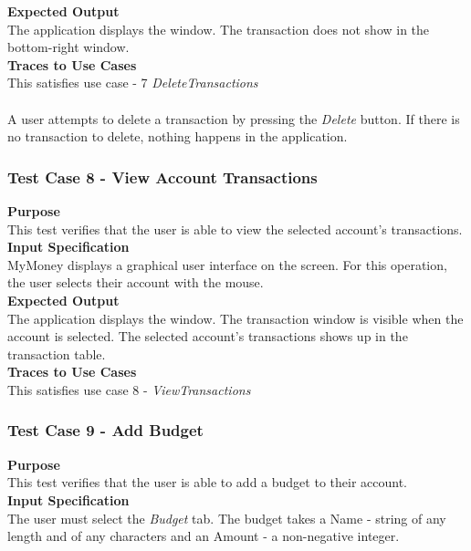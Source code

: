 \documentclass[12pt]{article}
\begin{document}
\noindent
{\bf Expected Output}\\
The application displays the window.       
The transaction does not show in the bottom-right window.\\

\noindent
{\bf Traces to Use Cases}\\
This satisfies use case  - 7 \textit{DeleteTransactions}\\

\\
A user attempts to delete a transaction by pressing the \textit{Delete} button. If there is no transaction to delete, nothing happens in the application.\\

\subsubsection{Test Case 8 - View Account Transactions} \label{TC-8}
\noindent
{\bf Purpose}\\
This test verifies that the user is able to view the selected account's transactions.\\
                                                    
\noindent
{\bf Input Specification}\\
MyMoney displays a graphical user interface on the screen.
For this operation, the user selects their account with the mouse.\\

\noindent
{\bf Expected Output}\\
The application displays the window.       
The transaction window is visible when the account is selected.
The selected account's transactions shows up in the transaction table. \\

\noindent
{\bf Traces to Use Cases}\\
This satisfies use case 8 - \textit{ViewTransactions}

\subsubsection{Test Case 9 - Add Budget} \label{TC-9}
\noindent
{\bf Purpose}\\
This test verifies that the user is able to add a budget to their account.\\

{\bf Input Specification}\\
The user must select the \textit{Budget} tab. The budget takes a Name - string of any length and of any characters
and an Amount - a non-negative integer.\\
\end{document}
